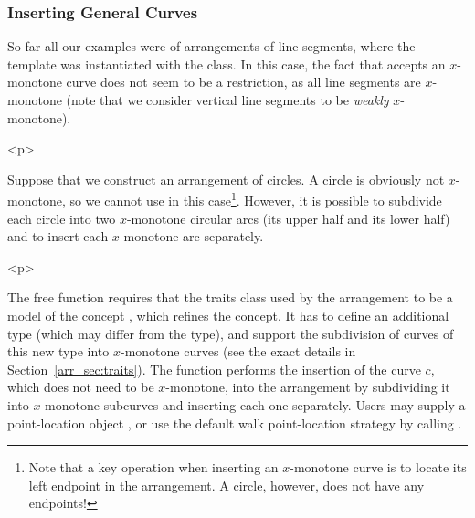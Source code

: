 \subsubsection{Inserting General Curves}
\label{arr_sssec:insert_gen}
%
So far all our examples were of arrangements of line segments,
where the  template was instantiated with the
 class. In this case, the fact that
 accepts an $x$-monotone curve does not
seem to be a restriction, as all line segments are $x$-monotone
(note that we consider vertical line segments to be {\em weakly}
$x$-monotone).

\begin{ccHtmlOnly}<p>\end{ccHtmlOnly}
Suppose that we construct an arrangement of circles. A circle is
obviously not $x$-monotone, so we cannot use
 in this case\footnote{Note that a key
operation when inserting an $x$-monotone curve is to locate its
left endpoint in the arrangement. A circle, however, does not have
any endpoints!}. However, it is possible to subdivide each circle
into two $x$-monotone circular arcs (its upper half and its lower
half) and to insert each $x$-monotone arc separately.

\begin{ccHtmlOnly}<p>\end{ccHtmlOnly}
The free function  requires that the traits class
used by the arrangement  to be a model of the concept
, which refines the
 concept. It has to define an
additional  type (which may differ from the
 type), and support the subdivision of curves
of this new type into $x$-monotone curves (see the exact details in
Section~\ref{arr_sec:traits}). The 
function performs the insertion of the curve $c$, which does not need
to be $x$-monotone, into the arrangement by subdividing it into
$x$-monotone subcurves and inserting each one separately. Users
may supply a point-location object , or use the default
walk point-location strategy by calling .

